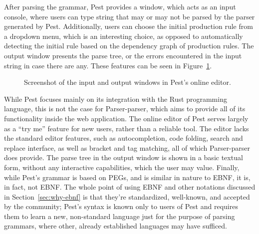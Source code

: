 \documentclass[english,bachelors,forcepolishlogotype]{wizthesis}
\newcommand{\thisproject}{Parser-parser}
\begin{document}
After parsing the grammar, Pest provides a window, which acts as an input
console, where users can type string that may or may not be parsed by the parser
generated by Pest. Additionally, users can choose the initial production rule
from a dropdown menu, which is an interesting choice, as opposed to
automatically detecting the initial rule based on the dependency graph of
production rules. The output window presents the parse tree, or the errors
encountered in the input string in case there are any. These features can be
seen in Figure~\ref{fig:pest-output}.

\begin{figure}[ht]
  \centering
  \caption{Screenshot of the input and output windows in Pest's online editor.}
  \label{fig:pest-output}
\end{figure}

While Pest focuses mainly on its integration with the Rust programming language,
this is not the case for \thisproject{}, which aims to provide all of its
functionality inside the web application. The online editor of Pest serves
largely as a ``try me'' feature for new users, rather than a reliable tool. The
editor lacks the standard editor features, such as autocompletion, code folding,
search and replace interface, as well as bracket and tag matching, all of which
\thisproject{} does provide. The parse tree in the output window is shown in a
basic textual form, without any interactive capabilities, which the user may
value. Finally, while Pest's grammar is based on PEGs, and is similar in nature
to EBNF, it is, in fact, not EBNF. The whole point of using EBNF and other
notations discussed in Section~\ref{sec:why-ebnf} is that they're standardized,
well-known, and accepted by the community; Pest's syntax is known only to users
of Pest and requires them to learn a new, non-standard language just for the
purpose of parsing grammars, where other, already established languages may have
sufficed.
\end{document}

